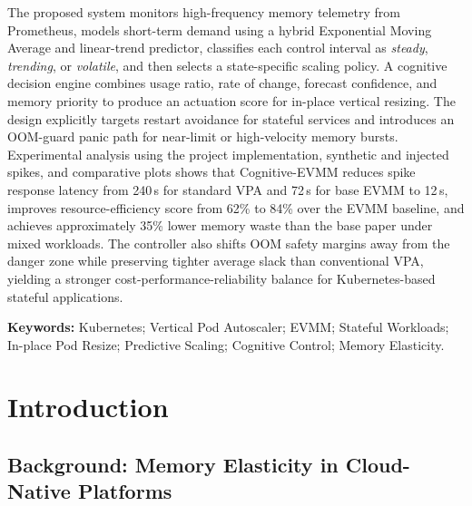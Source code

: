 \documentclass[12pt,a4paper]{article}
\begin{document}
The proposed system monitors high-frequency memory telemetry from Prometheus, models short-term demand using a hybrid Exponential Moving Average and linear-trend predictor, classifies each control interval as \emph{steady}, \emph{trending}, or \emph{volatile}, and then selects a state-specific scaling policy. A cognitive decision engine combines usage ratio, rate of change, forecast confidence, and memory priority to produce an actuation score for in-place vertical resizing. The design explicitly targets restart avoidance for stateful services and introduces an OOM-guard panic path for near-limit or high-velocity memory bursts. Experimental analysis using the project implementation, synthetic and injected spikes, and comparative plots shows that Cognitive-EVMM reduces spike response latency from 240\,s for standard VPA and 72\,s for base EVMM to 12\,s, improves resource-efficiency score from 62\% to 84\% over the EVMM baseline, and achieves approximately 35\% lower memory waste than the base paper under mixed workloads. The controller also shifts OOM safety margins away from the danger zone while preserving tighter average slack than conventional VPA, yielding a stronger cost-performance-reliability balance for Kubernetes-based stateful applications.

\medskip
\noindent\textbf{Keywords:} Kubernetes; Vertical Pod Autoscaler; EVMM; Stateful Workloads; In-place Pod Resize; Predictive Scaling; Cognitive Control; Memory Elasticity.

\clearpage
\pagestyle{fancy}
\tableofcontents
\clearpage
\listoffigures
\clearpage
\listoftables

\clearpage
\pagestyle{fancy}

\section{Introduction}
\label{sec:introduction}

\subsection{Background: Memory Elasticity in Cloud-Native Platforms}
\end{document}
